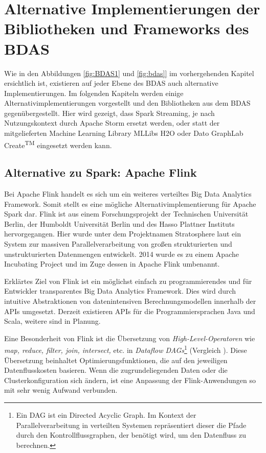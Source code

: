\chapter{Alternative Implementierungen der Bibliotheken und Frameworks des BDAS}
\label{chapter:alternative implementierungen}








Wie in den Abbildungen \ref{fig:BDAS1} und \ref{fig:bdas]} im vorhergehenden Kapitel ersichtlich ist, existieren auf jeder Ebene des BDAS auch alternative Implementierungen. Im folgenden Kapiteln werden einige Alternativimplementierungen vorgestellt und den Bibliotheken aus dem BDAS gegenübergestellt. Hier wird gezeigt, dass Spark Streaming, je nach Nutzungskontext durch Apache Storm ersetzt werden, oder statt der mitgelieferten Machine Learning Library MLLibs H2O oder Dato GraphLab Create\textsuperscript{TM} eingesetzt werden kann.  


\section{Alternative zu Spark: Apache Flink}
\label{section:apache flink}

Bei Apache Flink handelt es sich um ein weiteres verteiltes Big Data Analytics Framework. Somit stellt es eine mögliche Alternativimplementierung für Apache Spark dar. Flink ist aus einem Forschungsprojekt der Technischen Universität Berlin, der Humboldt Universität Berlin und des Hasso Plattner Instituts hervorgegangen. Hier wurde unter dem Projektnamen Stratosphere laut  ein System zur massiven Parallelverarbeitung von großen strukturierten und unstrukturierten Datenmengen entwickelt. 2014 wurde es zu einem Apache Incubating Project und im Zuge dessen in Apache Flink umbenannt. 

Erklärtes Ziel von Flink ist ein möglichst einfach zu programmierendes und für Entwickler transparentes Big Data Analytics Framework. Dies wird durch intuitive Abstraktionen von datenintensiven Berechnungsmodellen innerhalb der APIs umgesetzt. Derzeit existieren APIs für die Programmiersprachen Java und Scala, weitere sind in Planung. 

Eine Besonderheit von Flink ist die Übersetzung von \textit{High-Level-Operatoren} wie \textit{map, reduce, filter, join, intersect,} etc.  in \textit{Dataflow DAGs}\footnote{Ein DAG ist ein Directed Acyclic Graph. Im Kontext der Parallelverarbeitung in verteilten Systemen repräsentiert dieser die Pfade durch den Kontrollflussgraphen, der benötigt wird, um den Datenfluss zu berechnen.} (Vergleich ). Diese Übersetzung beinhaltet Optimierungsfunktionen, die auf den jeweiligen Datenflusskosten basieren. Wenn die zugrundeliegenden Daten oder die Clusterkonfiguration sich ändern, ist eine Anpassung der Flink-Anwendungen so mit sehr wenig Aufwand verbunden. 

